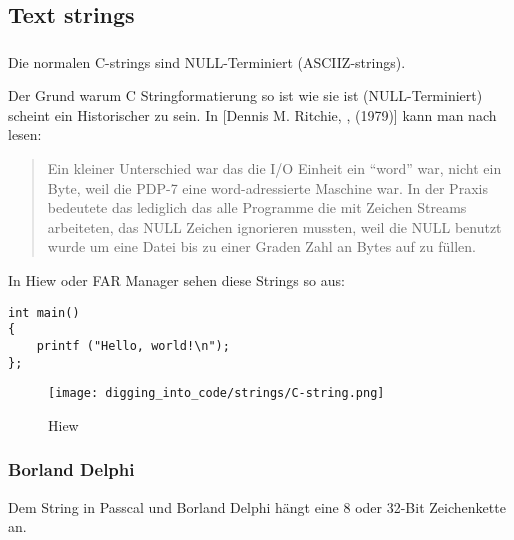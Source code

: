 \subsection{Text strings}

\subsubsection{\CCpp}

\label{C_strings}

Die normalen C-strings sind NULL-Terminiert (\ac{ASCIIZ}-strings).

Der Grund warum C Stringformatierung so ist wie sie ist (NULL-Terminiert) scheint ein Historischer zu sein.
In [Dennis M. Ritchie, , (1979)] kann man nach lesen:

\begin{framed}
\begin{quotation}
Ein kleiner Unterschied war das die I/O Einheit ein ``word'' war, nicht ein Byte, weil die PDP-7 eine word-adressierte
Maschine war. In der Praxis bedeutete das lediglich das alle Programme die mit Zeichen Streams arbeiteten, das NULL 
Zeichen ignorieren mussten, weil die NULL benutzt wurde um eine Datei bis zu einer Graden Zahl an Bytes auf zu f\"ullen.

\end{quotation}
\end{framed}


In Hiew oder FAR Manager sehen diese Strings so aus:

\begin{lstlisting}[style=customc]
int main()
{
	printf ("Hello, world!\n");
};
\end{lstlisting}

\begin{figure}[H]
\centering
\texttt{[image: digging\_into\_code/strings/C-string.png]}
\caption{Hiew}
\end{figure}


\subsubsection{Borland Delphi}

Dem String in Passcal und Borland Delphi h\"angt eine 8 oder 32-Bit Zeichenkette an. 

